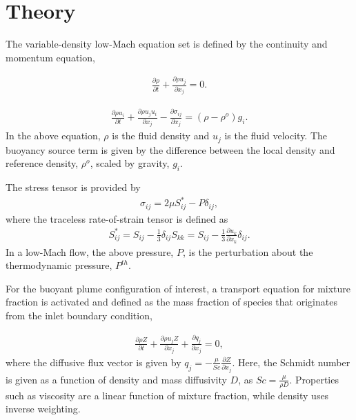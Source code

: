 \documentclass{article}
\begin{document}
\section{Theory}
The variable-density low-Mach equation set is defined by the continuity 
and momentum equation,

\begin{align}
  \frac {\partial \rho }{\partial t} + \frac{ \partial \rho u_j}{\partial x_j} = 0.
\label{eq:contEq}
\end{align} 

\begin{align}
  \frac {\partial \rho u_i }{\partial t} + \frac{ \partial \rho u_j u_i}{\partial x_j} 
-\frac{\partial \sigma_{ij}}{\partial x_j} = \left( \rho - \rho^o \right) g_i.
\label{eq:momEq}
\end{align}
%
In the above equation, $\rho$ is the fluid density and $u_j$ is the 
fluid velocity. The buoyancy source term is given by the difference 
between the local density and reference density, $\rho^o$, scaled 
by gravity, $g_i$.

The stress tensor is provided by
\begin{align}
\sigma_{ij}  = 2 \mu S^*_{ij} - P \delta_{ij},
\end{align}
%
where the traceless rate-of-strain tensor is defined as
\begin{align}
S^*_{ij}  = S_{ij} - \frac{1}{3} \delta_{ij} S_{kk} \nonumber
		     = S_{ij} - \frac{1}{3} \frac{\partial  u_k }{\partial x_k}\delta_{ij}.
\end{align}
In a low-Mach flow, the above pressure, $P$, is the perturbation about 
the thermodynamic pressure, $P^{th}$. 

For the buoyant plume configuration of interest, a transport equation 
for mixture fraction is activated and defined as the mass fraction of 
species that originates from the inlet boundary condition,

\begin{align}
  \frac {\partial \rho Z }{\partial t} + \frac{ \partial \rho u_j Z}{\partial x_j} 
+\frac{\partial q_j }{\partial x_j} = 0,
\label{eq:zEq}
\end{align}
where the diffusive flux vector is given by $q_j = -\frac{\mu}{Sc}\frac{\partial Z}{\partial x_j}$.
Here, the Schmidt number is given as a function of density and mass 
diffusivity $D$, as $Sc = \frac{\mu}{\rho D}$. Properties such as viscosity 
are a linear function of mixture fraction, while density uses inverse weighting.
\end{document}
